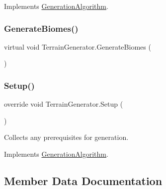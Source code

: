 Implements \mbox{\hyperlink{class_generation_algorithm_ac2df20f7751c1b480ab958791d5c7d41}{Generation\+Algorithm}}.

\mbox{\label{class_terrain_generator_ad39c135988960e8e12ea5bd36569336f}} 
\subsubsection{\texorpdfstring{Generate\+Biomes()}{GenerateBiomes()}}
{\footnotesize\ttfamily virtual void Terrain\+Generator.\+Generate\+Biomes (\begin{DoxyParamCaption}{ }\end{DoxyParamCaption})\hspace{0.3cm}{\ttfamily [virtual]}}

\mbox{\label{class_terrain_generator_ada250260b370382c1ba5cad243a67f10}} 
\subsubsection{\texorpdfstring{Setup()}{Setup()}}
{\footnotesize\ttfamily override void Terrain\+Generator.\+Setup (\begin{DoxyParamCaption}{ }\end{DoxyParamCaption})\hspace{0.3cm}{\ttfamily [virtual]}}



Collects any prerequisites for generation. 



Implements \mbox{\hyperlink{class_generation_algorithm_a5e891b08f0c1d8f4ccc9ad06667691ec}{Generation\+Algorithm}}.



\subsection{Member Data Documentation}
\mbox{\label{class_terrain_generator_ac4a6046f1aa01960502dae2faa7bbf8d}} 

